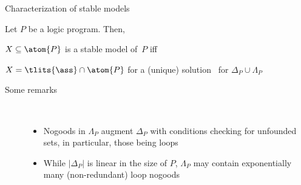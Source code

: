 \begin{frame}{Characterization of stable models}
\bigskip
\begin{theorem}
Let $P$ be a logic program. Then,

\qquad $X\subseteq\atom{P}$ is a stable model of~$P$ \alert{iff}

\qquad $X=\tlits{\ass}\cap\atom{P}$ for a (unique)
solution \ass\ for $\Delta_P\cup\Lambda_P$
\end{theorem}
\bigskip
\pause
\begin{description}
\item [Some remarks] \
\begin{itemize}
\item
Nogoods in $\Lambda_P$ augment $\Delta_P$
with conditions checking for \alert{unfounded sets},
in particular,
those being loops
\item
While $|\Delta_P|$ is linear in the size of $P$,
$\Lambda_P$ may contain \alert{exponentially many} (non-redundant) loop nogoods
\end{itemize}
\end{description}
\end{frame}
